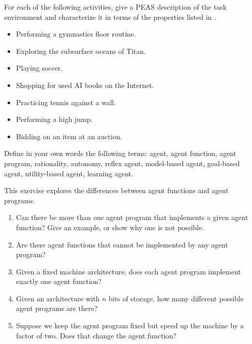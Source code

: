 \begin{iexercise}
For each of the following activities, give a PEAS description of the task environment and characterize it in terms of the properties 
listed in . 
\begin{itemize}
\item Performing a gymnastics floor routine. 
\item Exploring the subsurface oceans of Titan.
\item Playing soccer.
\item Shopping for used AI books on the Internet.
\item Practicing tennis against a wall.
\item Performing a high jump.
\item Bidding on an item at an auction.
\end{itemize}
\end{iexercise} 



\begin{exercise}
Define in your own words the following terms: agent, agent function,
agent program, rationality, autonomy, reflex agent, model-based agent,
goal-based agent, utility-based agent, learning agent.
\end{exercise} 

\begin{exercise}%
This exercise explores the differences between agent functions
and agent programs.
\begin{enumerate}
\item Can there be more than one
agent program that implements a given agent function?
Give an example, or show why one is not possible.
\item Are there agent functions that cannot be implemented by any agent
program?
\item Given a fixed machine architecture, does each agent program
implement exactly one agent function?
\item Given an architecture with \(n\) bits of storage, how many
different possible agent programs are there?  
\item Suppose we keep the agent program fixed but speed up the machine by a factor of two. Does that change the agent function?
\end{enumerate}
\end{exercise} 

